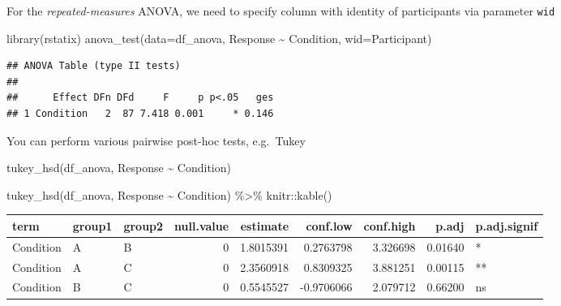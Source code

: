 \documentclass[
]{book}
\newenvironment{Shaded}{\begin{snugshade}}{\end{snugshade}}
\newcommand{\AttributeTok}[1]{\textcolor[rgb]{0.77,0.63,0.00}{#1}}
\newcommand{\FunctionTok}[1]{\textcolor[rgb]{0.00,0.00,0.00}{#1}}
\newcommand{\NormalTok}[1]{#1}
\newcommand{\SpecialCharTok}[1]{\textcolor[rgb]{0.00,0.00,0.00}{#1}}
\begin{document}
For the \emph{repeated-measures} ANOVA, we need to specify column with identity of participants via parameter \texttt{wid}

\begin{Shaded}
\begin{Highlighting}[]
\FunctionTok{library}\NormalTok{(rstatix)}
\FunctionTok{anova\_test}\NormalTok{(}\AttributeTok{data=}\NormalTok{df\_anova, Response }\SpecialCharTok{\textasciitilde{}}\NormalTok{ Condition, }\AttributeTok{wid=}\NormalTok{Participant)}
\end{Highlighting}
\end{Shaded}

\begin{verbatim}
## ANOVA Table (type II tests)
## 
##      Effect DFn DFd     F     p p<.05   ges
## 1 Condition   2  87 7.418 0.001     * 0.146
\end{verbatim}

You can perform various pairwise post-hoc tests, e.g.~Tukey

\begin{Shaded}
\begin{Highlighting}[]
\FunctionTok{tukey\_hsd}\NormalTok{(df\_anova, Response }\SpecialCharTok{\textasciitilde{}}\NormalTok{ Condition)}
\end{Highlighting}
\end{Shaded}

\begin{Shaded}
\begin{Highlighting}[]
\FunctionTok{tukey\_hsd}\NormalTok{(df\_anova, Response }\SpecialCharTok{\textasciitilde{}}\NormalTok{ Condition) }\SpecialCharTok{\%\textgreater{}\%}
\NormalTok{  knitr}\SpecialCharTok{::}\FunctionTok{kable}\NormalTok{()}
\end{Highlighting}
\end{Shaded}

\begin{tabular}{l|l|l|r|r|r|r|r|l}
\hline
term & group1 & group2 & null.value & estimate & conf.low & conf.high & p.adj & p.adj.signif\\
\hline
Condition & A & B & 0 & 1.8015391 & 0.2763798 & 3.326698 & 0.01640 & *\\
\hline
Condition & A & C & 0 & 2.3560918 & 0.8309325 & 3.881251 & 0.00115 & **\\
\hline
Condition & B & C & 0 & 0.5545527 & -0.9706066 & 2.079712 & 0.66200 & ns\\
\hline
\end{tabular}
\end{document}

